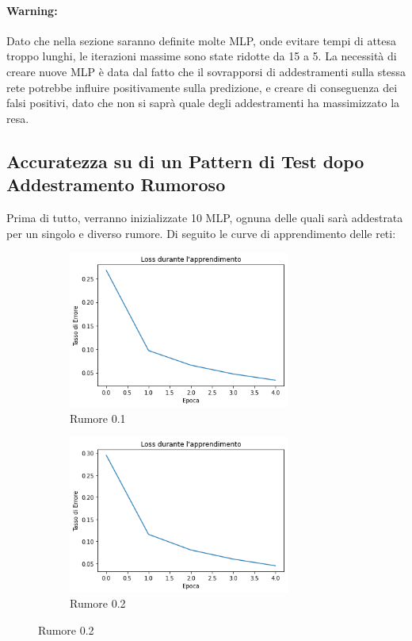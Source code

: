 \documentclass[12pt, a4paper]{article}
\begin{document}
\paragraph{Warning:} Dato che nella sezione saranno definite molte MLP, onde evitare tempi di attesa troppo lunghi, le iterazioni massime sono state ridotte da 15 a 5. La necessità di creare nuove MLP è data dal fatto che il sovrapporsi di addestramenti sulla stessa rete potrebbe influire positivamente sulla predizione, e creare di conseguenza dei falsi positivi, dato che non si saprà quale degli addestramenti ha massimizzato la resa.
\subsection{Accuratezza su di un Pattern di Test dopo Addestramento Rumoroso}
Prima di tutto, verranno inizializzate 10 MLP, ognuna delle quali sarà addestrata per un singolo e diverso rumore. Di seguito le curve di apprendimento delle reti:
\begin{figure}[H]
    \begin{subfigure}{0.5\textwidth}
        \centering
        \caption{Rumore 0.1}
        \includegraphics[width=0.80\textwidth]{Rumore1.png}
    \end{subfigure}
    \begin{subfigure}{0.5\textwidth}
        \centering
        \caption{Rumore 0.2}
        \includegraphics[width=0.80\textwidth]{Rumore2.png}
    \end{subfigure}    
\end{figure}
\end{document}
